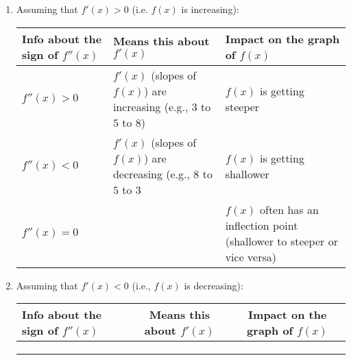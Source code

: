 \documentclass{ximera}
\begin{document}
\begin{exploration}
\begin{enumerate}
    \item Assuming that $f'(x) > 0$ (i.e. $f(x)$ is increasing):
    \begin{center}
        \begin{tabular}{|p{2cm}|p{3.5cm}|p{4cm}|} 
         \hline
           Info about the sign of $f''(x)$  & Means this about $f'(x)$ & Impact on the graph of $f(x)$ \\ \hline
           $f''(x) > 0$  & $f'(x)$ (slopes of $f(x)$)  are increasing (e.g., $3$ to $5$ to $8$) & $f(x)$ is getting steeper \\ \hline
           $f''(x) < 0$ & $f'(x)$ (slopes of $f(x)$) are decreasing (e.g., $8$ to $5$ to $3$ & $f(x)$ is getting shallower \\ \hline
           $f''(x) = 0$ & & $f(x)$ often has an inflection point (shallower to steeper or vice versa) \\ \hline
        \end{tabular}
    \end{center}
    \item Assuming that $f'(x) < 0$ (i.e., $f(x)$ is decreasing):
    \begin{center}
    \def \arraystretch{2}
        \begin{tabular}{|p{2cm}|c|c|} \hline
           Info about the sign of $f''(x)$  & Means this about $f'(x)$ & Impact on the graph of $f(x)$ \\ \hline
           & & \\ \hline
           & & \\ \hline
           & & \\ \hline
        \end{tabular}
    \end{center}
\end{enumerate}
\end{exploration}
\end{document}
